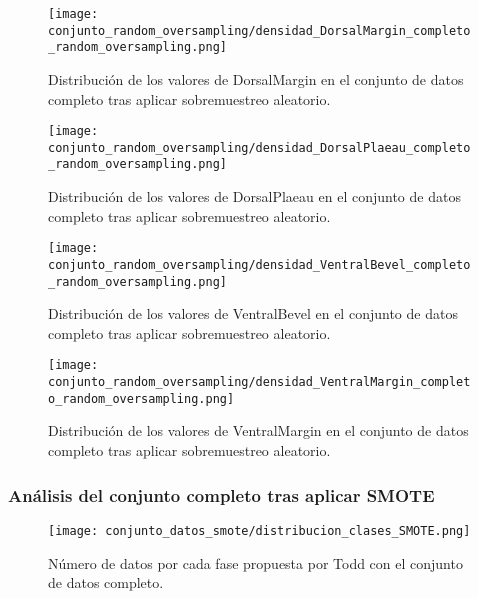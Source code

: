 \begin{figure}[H]
	\centering
	\texttt{[image: conjunto\_random\_oversampling/densidad\_DorsalMargin\_completo\_random\_oversampling.png]}
	\caption{Distribución de los valores de DorsalMargin en el conjunto de datos completo tras aplicar sobremuestreo aleatorio.}
	\label{fig:densidad_DorsalMargin_completo_random_oversampling}
\end{figure}




\begin{figure}[H]
	\centering
	\texttt{[image: conjunto\_random\_oversampling/densidad\_DorsalPlaeau\_completo\_random\_oversampling.png]}
	\caption{Distribución de los valores de DorsalPlaeau en el conjunto de datos completo tras aplicar sobremuestreo aleatorio.}
	\label{fig:densidad_DorsalPlaeau_completo_random_oversampling}
\end{figure}



\begin{figure}[H]
	\centering
	\texttt{[image: conjunto\_random\_oversampling/densidad\_VentralBevel\_completo\_random\_oversampling.png]}
	\caption{Distribución de los valores de VentralBevel en el conjunto de datos completo tras aplicar sobremuestreo aleatorio.}
	\label{fig:densidad_VentralBevel_completo_random_oversampling}
\end{figure}

\begin{figure}[H]
	\centering
	\texttt{[image: conjunto\_random\_oversampling/densidad\_VentralMargin\_completo\_random\_oversampling.png]}
	\caption{Distribución de los valores de VentralMargin en el conjunto de datos completo tras aplicar sobremuestreo aleatorio.}
	\label{fig:densidad_VentralMargin_completo_random_oversampling}
\end{figure}


\subsubsection{Análisis del conjunto completo tras aplicar SMOTE}

\begin{figure}[H]
	\centering
	\texttt{[image: conjunto\_datos\_smote/distribucion\_clases\_SMOTE.png]}
	\caption{Número de datos por cada fase propuesta por Todd con el conjunto de datos completo.}
	\label{fig:conteo_c_smote}
\end{figure}

